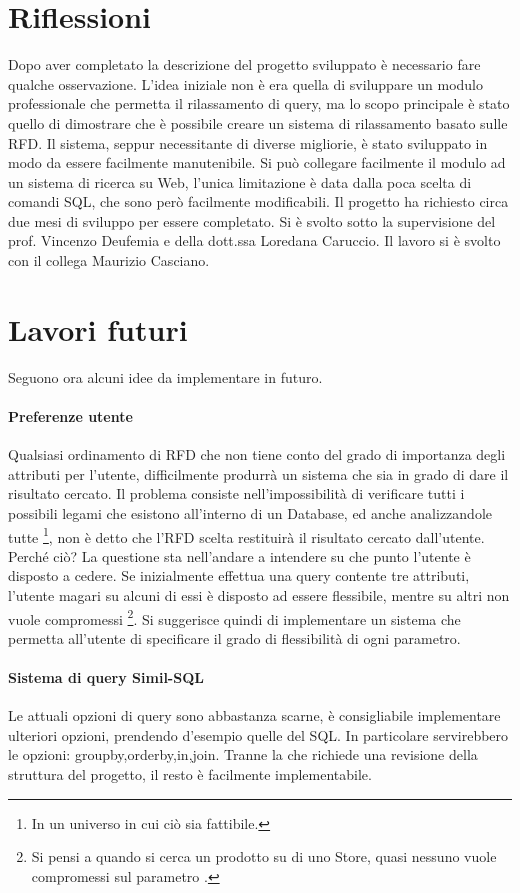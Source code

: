 \section{Riflessioni}
Dopo aver completato la descrizione del progetto sviluppato è necessario fare qualche osservazione.
L'idea iniziale non è era quella di sviluppare un modulo professionale che permetta il rilassamento di query, ma lo scopo principale è stato quello di dimostrare che è possibile creare un sistema di rilassamento basato sulle RFD.
Il sistema, seppur necessitante di diverse migliorie, è stato sviluppato in modo da essere facilmente manutenibile. 
Si può collegare facilmente il modulo ad un sistema di ricerca su Web, l'unica limitazione è data dalla poca scelta di comandi SQL, che sono però facilmente modificabili.
Il progetto ha richiesto circa due mesi di sviluppo per essere completato. Si è svolto sotto la supervisione del prof. Vincenzo Deufemia e della dott.ssa Loredana Caruccio. Il lavoro si è svolto con il collega Maurizio Casciano.

\section{Lavori futuri}
Seguono ora alcuni idee da implementare in futuro.
\paragraph{Preferenze utente}
Qualsiasi ordinamento di RFD che non tiene conto del grado di importanza degli attributi per l'utente, difficilmente produrrà un sistema che sia in grado di dare il risultato cercato.
Il problema consiste nell'impossibilità di verificare tutti i possibili legami che esistono all'interno di un Database, ed anche analizzandole tutte \footnote{In un universo in cui ciò sia fattibile.}, non è detto che l'RFD scelta restituirà il risultato cercato dall'utente. Perché ciò?
La questione sta nell'andare a intendere su che punto l'utente è disposto a cedere. Se inizialmente effettua una query contente tre attributi, l'utente magari su alcuni di essi è disposto ad essere flessibile, mentre su altri non vuole compromessi \footnote{Si pensi a quando si cerca un prodotto su di uno Store, quasi nessuno vuole compromessi sul parametro .}.
Si suggerisce quindi di implementare un sistema che permetta all'utente di specificare il grado di flessibilità di ogni parametro.
\paragraph{Sistema di query Simil-SQL}
Le attuali opzioni di query sono abbastanza scarne, è consigliabile implementare ulteriori opzioni, prendendo d'esempio quelle del SQL. In particolare servirebbero le opzioni: groupby,orderby,in,join.
Tranne la  che richiede una revisione della struttura del progetto, il resto è facilmente implementabile.
